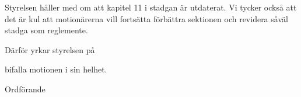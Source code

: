 \documentclass[../_main/handlingar.tex]{subfiles}
\begin{document}
\motionssvar
Styrelsen håller med om att kapitel 11 i stadgan är utdaterat. Vi tycker också att det är kul att motionärerna vill fortsätta förbättra sektionen och revidera såväl stadga som reglemente. 

Därför yrkar styrelsen på 

\begin{attsatser}
    \att  bifalla motionen i sin helhet.
\end{attsatser}

\begin{signatures}{1}
    \ist
    \signature{Daniel Bakic}{Ordförande}
\end{signatures}
\end{document}
